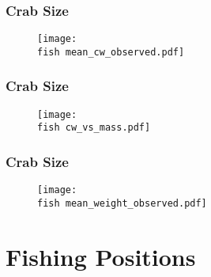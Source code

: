 \documentclass{beamer}
\newcommand{\fish}{C:/Rsaves/fishery/2017/}
\begin{document}


\begin{frame}
\frametitle{Crab Size}
\begin{figure}

 \vspace*{-.5cm}
 \centerline{\texttt{[image: \\fish mean\_cw\_observed.pdf]}}

 \end{figure}
\end{frame}


\begin{frame}
\frametitle{Crab Size}
\begin{figure}

 \vspace*{-.5cm}
 \centerline{\texttt{[image: \\fish cw\_vs\_mass.pdf]}}

 \end{figure}
\end{frame}


\begin{frame}
\frametitle{Crab Size}
\begin{figure}

 \vspace*{-.5cm}
 \centerline{\texttt{[image: \\fish mean\_weight\_observed.pdf]}}

\end{figure}
\end{frame}


\section{Fishing Positions}
\end{document}
